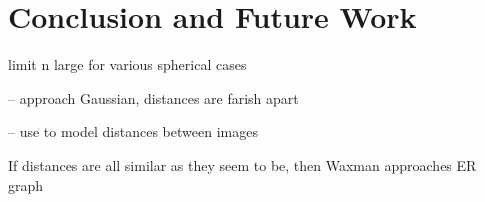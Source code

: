 \documentclass{article}
\begin{document}
\clearpage


 
\clearpage
\section{Conclusion and Future Work}


limit n large for various spherical cases

  -- approach Gaussian, distances are farish apart

  -- use to model distances between images

If distances are all similar as they seem to be, then Waxman
approaches ER graph 


\setlength{\parskip}{1mm}

% 

\end{document}
